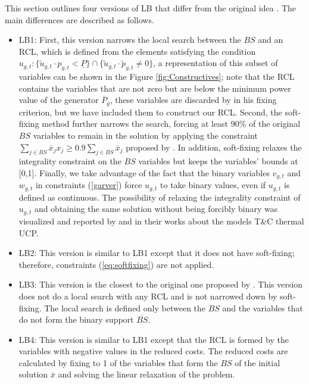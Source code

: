 This section outlines four versions of LB that differ from the original idea \citep{Fischetti2003}. The main differences are described as follows.
\begin{itemize}
    \item LB1: First, this version narrows the local search between the $\textit{BS}$ and an RCL, which is defined from the elements satisfying the condition ${u}_{g,t}: \{ \tilde{u}_{g,t}\cdot{p}_{g,t} < \underline{P} \} \cap \{\tilde{u}_{g,t}\cdot\tilde{p}_{g,t}\neq 0\}$, a representation of this subset of variables can be shown in the Figure \ref{fig:Constructives}; note that the RCL contains the variables that are not zero but are below the minimum power value of the generator $\overline{P}_{g}$, these variables are discarded by \citet{Harjunkoski2021} in his fixing criterion, but we have included them to construct our RCL.     
    Second, the soft-fixing method further narrows the search, forcing at least 90\% of the original $\textit{BS}$ variables to remain in the solution by applying the constraint 
    $\sum\limits_{j\in\textit{BS}}\bar{x}_j x_j \geq 0.9 \sum\limits_{j\in\textit{BS}}\bar{x}_j$ proposed by \citet{Fischetti2003}. In addition, soft-fixing relaxes the integrality constraint on the $\textit{BS}$ variables but keeps the variables' bounds at [0,1]. Finally, we take advantage of the fact that the binary variables $v_{g,t}$ and $w_{g,t}$ in constraints (\ref{garver}) force $u_{g,t}$ to take binary values, even if $u_{g,t}$ is defined as continuous. The possibility of relaxing the integrality constraint of $u_{g,t}$ and obtaining the same solution without being forcibly binary was visualized and reported by \citet{Morales-Espania2013} and \citet{Morales-Espania2014} in their works about the models T\&C thermal UCP.
    \item LB2: This version is similar to LB1 except that it does not have soft-fixing; therefore, constraints (\ref{eq:softfixing}) are not applied.  %
    \item LB3: This version is the closest to the original one proposed by \citet{Fischetti2003}. This version does not do a local search with any RCL and is not narrowed down by soft-fixing. The local search is defined only between the $\textit{BS}$ and the variables that do not form the binary support $\overline{\textit{BS}}$.
    \item LB4: This version is similar to LB1 except that the RCL is formed by the variables with negative values in the reduced costs. The reduced costs are calculated by fixing to 1 of the variables that form the $\textit{BS}$ of the initial solution $\bar{x}$ and solving the linear relaxation of the problem.    
\end{itemize}


